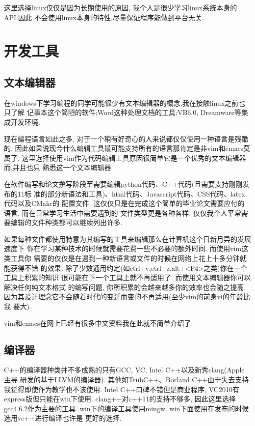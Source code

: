 这里选择linux仅仅是因为长期使用的原因, 我个人是很少学习linux系统本身的API.因此
不会使用linux本身的特性,尽量保证程序能做到平台无关.

\section{开发工具}
\subsection{文本编辑器}
在windows下学习编程的同学可能很少有文本编辑器的概念,我在接触linux之前也只了解
记事本这个简陋的软件;Word这种处理文档的工具;VB6.0, Dreamware等集成开发环境. 

现在编程语言如此之多, 对于一个稍有好奇心的人来说都仅仅使用一种语言是残酷的.
因此如果说现今什么编辑工具最可能支持所有的语言那肯定是非vim和emacs莫属了.
这里选择使用vim作为代码编辑工具原因很简单它是一个优秀的文本编辑器而,并且也只
熟悉这一个文本编辑器.

在软件编写和论文撰写阶段至需要编辑python代码、C++代码(且需要支持刚刚发布的11标
准的部分新语法和工具)、html代码、Javascript代码、CSS代码、latex代码以及CMake的
配置文件.
这仅仅只是在完成这个简单的毕业论文需要应付的语言. 而在日常学习生活中需要遇到的
文件类型更是各种各样, 仅仅我个人平常需要编辑的文件种类都可以继续列出许多.

如果每种文件都使用特意为其编写的工具来编辑那么在计算机这个日新月异的发展速度下
你在学习某种技术的时候就需要花费一些不必要的额外时间. 而使用vim这类工具你
需要的仅仅是在遇到一种新语言或文件的时候在网络上花上十多分钟就能获得不错
的效果.
除了少数通用约定(如ctrl+v,ctrl+z,alt+<F4>之类)你在一个工具上积累的知识
很可能在下一个工具上就不再适用了.  而使用文本编辑器你可以解决任何纯文本格式
的编写问题, 你所积累的会越来越多你的效率也会随之提高. 
因为其设计理念它不会随着时代的变迁而变的不再适用(至少vim的前身vi的年龄比我
要大).

vim和emacs在网上已经有很多中文资料我在此就不简单介绍了. 

\subsection{编译器}
C++的编译器种类并不多成熟的只有GCC, VC, Intel C++以及新秀clang(Apple主导
研发的基于LLVM的编译器).
其他如TrubC++、Borland C++由于失去支持我觉得即使作为教学也不该使用.
Intel C++口碑不错但是商业程序, VC2010有express版但只能在win下使用.
clang++对c++11的支持不够多, 因此这里选择gcc4.6.2作为主要的工具.
win下的编译工具使用mingw.  win下面使用在发布的时候选用vc++进行编译也许是
更好的选择.

